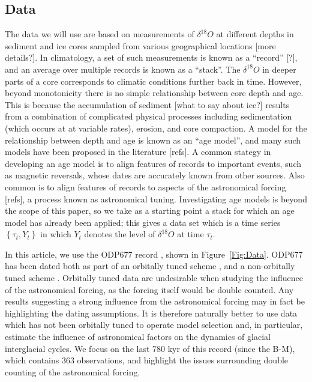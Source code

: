 \documentclass[a4paper,12pt]{article}
\begin{document}
\subsection{Data}

The data we will use are based on measurements of $\delta^{18}O$ at different depths in sediment
and ice cores sampled from various geographical locations [more details?].  In
climatology, a set of such measurements is known as a ``record'' [?], and an average
over multiple records  is known as a ``stack''.  The $\delta^{18}O$ in deeper parts of a
core corresponds to climatic conditions further back in time.  However, beyond monotonicity
there is no simple relationship between core depth and age.  This is because the
accumulation of sediment [what to say about ice?] results from a combination of 
complicated physical processes
including sedimentation (which occurs at at variable rates), erosion, and core
compaction.  A model for the relationship between depth and age is known as an ``age
model'', and many such models have been proposed in the literature [refs].  
A common stategy in developing an age
model is to align features of records to important events, such as magnetic reversals,
whose dates are accurately known from other sources.  Also common is to align features of records to aspects of the
astronomical forcing [refs], a process known as astronomical tuning.  Investigating age 
models is beyond the scope of this paper, so we take as a starting point a stack for which
an age model has already been applied; this gives a data set which is a time series 
$\left\{ \tau_t, Y_t\right\}$ in which $Y_t$ denotes the level of $\delta^{18}O$ at time $\tau_t$.  



In this article, we use 
the ODP677 record \cite{Shackleton1990}, shown in Figure~\ref{Fig:Data}.
ODP677 has been dated both as part of an orbitally tuned scheme \cite{Lisiecki2005}, and a non-orbitally tuned scheme \cite{Huybers2007}. Orbitally tuned data are undesirable when studying the influence of the astronomical forcing, as the forcing itself would be double counted.
Any results suggesting a strong influence from the astronomical forcing may in fact be highlighting the dating assumptions.
It is therefore naturally better to use data which has not been orbitally tuned to operate model selection and, in particular, estimate the influence of astronomical factors on the dynamics of glacial interglacial cycles.
  We focus on the last 780 kyr of this record (since the B-M), which contains 363 observations, and highlight the issues surrounding double counting of the astronomical forcing.
\end{document}
